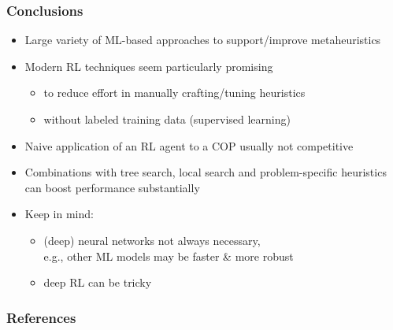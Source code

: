 \documentclass[aspectratio=1610]{beamer}
\renewcommand{\footnotesize}{\scriptsize}
\begin{document}
\begin{frame}
	\frametitle{Conclusions}
	\begin{itemize}
		\itemsep2.5ex
		\item Large variety of ML-based approaches to support/improve metaheuristics
		\item Modern RL techniques seem particularly promising
		\begin{itemize}
			\item to reduce effort in manually crafting/tuning heuristics
			\item without labeled training data (supervised learning)
		\end{itemize}
		\item Naive application of an RL agent to a COP usually not competitive
		\item Combinations with tree search, local search and problem-specific heuristics can boost performance substantially
		\item Keep in mind: 
		\begin{itemize}
			\item (deep) neural networks not always necessary,\\
			e.g., other ML models may be faster \& more robust
			\item deep RL can be tricky
		\end{itemize}
	
	\end{itemize}
\end{frame}





\begin{frame}[allowframebreaks]
	\frametitle{References}
	\footnotesize
	
	
\end{frame}
\end{document}

